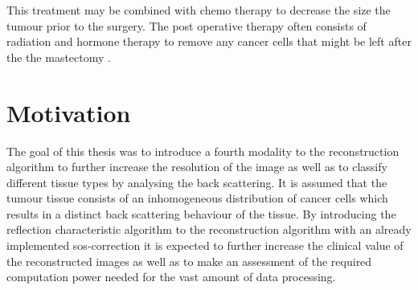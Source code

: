 This treatment may be combined with chemo therapy to decrease the size the tumour prior to the surgery. The post operative therapy often consists of radiation and hormone therapy to remove any cancer cells that might be left after the the mastectomy \cite{NationalInstitutesofHealthNIH-NationalCancerInstituteNCIBreastTreatment}.


\section{Motivation}

The goal of this thesis was to introduce a fourth modality to the reconstruction algorithm to further increase the resolution of the image as well as to classify different tissue types by analysing the back scattering. It is assumed that the tumour tissue consists of an inhomogeneous distribution of cancer cells which results in a distinct back scattering behaviour of the tissue.
By introducing the reflection characteristic algorithm to the reconstruction algorithm with an already implemented \ac{sos}-correction it is expected to further increase the clinical value of the reconstructed images as well as to make an assessment of the required computation power needed for the vast amount of data processing.


